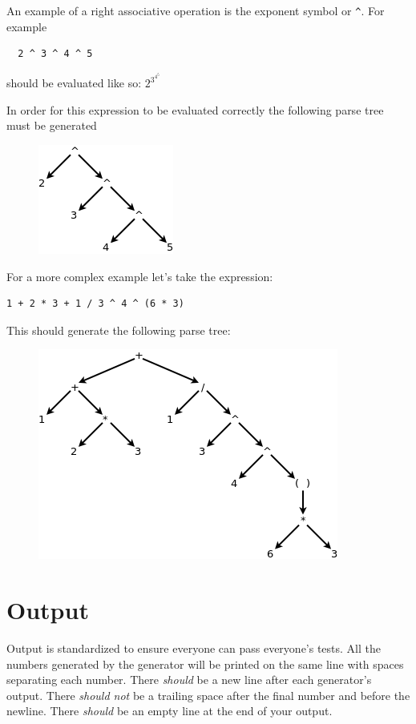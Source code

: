 \documentclass{article}
\newcommand{\code}[1]{\texttt{\textmd{#1}}}
\begin{document}
An example of a right associative operation is the exponent symbol or \code{\textasciicircum}.
For example
\begin{lstlisting}
  2 ^ 3 ^ 4 ^ 5
\end{lstlisting}

should be evaluated like so:
\begin{math}
  2 ^ {\displaystyle 3 ^ {\displaystyle 4 ^ {\displaystyle 5 }}}
\end{math}

In order for this expression to be evaluated correctly the following parse tree must be generated
\begin{figure}[H]
  \centering
  \includegraphics{static/right-assoc-pow.png}
\end{figure}

For a more complex example let's take the expression:
\begin{lstlisting}
1 + 2 * 3 + 1 / 3 ^ 4 ^ (6 * 3)
\end{lstlisting}

This should generate the following parse tree:
\begin{figure}[H]
  \centering
  \includegraphics{static/assoc-example.png}
\end{figure}

\section{Output}
Output is standardized to ensure everyone can pass everyone's tests. All the numbers generated by
the generator will be printed on the same line with spaces separating each number. There
\textit{should} be a new line after each generator's output. There \textit{should not} be a
trailing space after the final number and before the newline. There \textit{should} be an empty
line at the end of your output.
\end{document}
